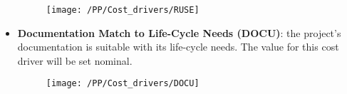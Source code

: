 \begin{itemize}
	   \begin{figure}[!ht]
      \centering
      \vspace{0.2cm}
      \texttt{[image: /PP/Cost\_drivers/RUSE]}\\
      \vspace{0.2cm}
      \label{fig:RUSE} 
    \end{figure}
    \item \textbf{Documentation Match to Life-Cycle Needs (DOCU)}: the project's documentation is suitable with its life-cycle needs. The value for this cost driver will be set nominal.
    \begin{figure}[!ht]
      \centering
      \vspace{0.2cm}
      \texttt{[image: /PP/Cost\_drivers/DOCU]}\\
      \vspace{0.2cm}
      \label{fig:DOCU} 
    \end{figure}
\end{itemize}

